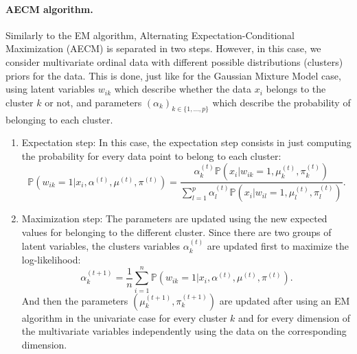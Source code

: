\paragraph{AECM algorithm.} Similarly to the EM algorithm, Alternating Expectation-Conditional Maximization (AECM) \citep{meng1997algorithm} is separated in two steps. However, in this case, we consider multivariate ordinal data with different possible distributions (clusters) priors for the data. This is done, just like for the Gaussian Mixture Model case, using latent variables $w_{ik}$ which describe whether the data $x_i$ belongs to the cluster $k$ or not, and parameters $(\alpha_k)_{k\in \{1, \ldots, p\}}$ which describe the probability of belonging to each cluster. 
\begin{enumerate}
    \item Expectation step: In this case, the expectation step consists in just computing the probability for every data point to belong to each cluster:
    \begin{equation}
        \mathbb{P}(w_{ik}=1|x_i, \alpha^{(t)}, \mu^{(t)}, \pi^{(t)}) = \frac{\alpha_k^{(t)}\mathbb{P}(x_i|w_{ik}=1, \mu_k^{(t)}, \pi_k^{(t)})}{\sum_{l=1}^p\alpha_l^{(t)}\mathbb{P}(x_i|w_{il}=1, \mu_l^{(t)}, \pi_l^{(t)})}.
    \end{equation}
    \item Maximization step: The parameters are updated using the new expected values for belonging to the different cluster. Since there are two groups of latent variables, the clusters variables $\alpha_k^{(t)}$ are updated first to maximize the log-likelihood:
    \begin{equation}
    \alpha_k^{(t+1)} = \frac{1}{n} \sum_{i=1}^n \mathbb{P}(w_{ik}=1|x_i, \alpha^{(t)}, \mu^{(t)}, \pi^{(t)}).
    \end{equation}
    And then the parameters $(\mu_k^{(t+1)}, \pi_k^{(t+1)})$ are updated after using an EM algorithm in the univariate case for every cluster $k$ and for every dimension of the multivariate variables independently using the data on the corresponding dimension.
\end{enumerate}

